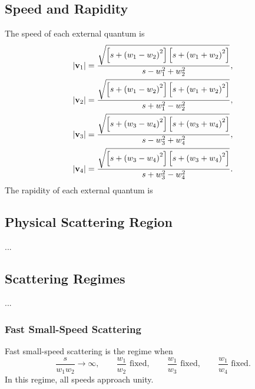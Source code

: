 \subsection{Speed and Rapidity}
The speed of each external quantum is
\begin{align}
	\left\lvert \mathbf{v}_{1} \right\rvert &= \frac{\sqrt{\left[ s + \left( w_{1} - w_{2} \right)^{2} \right] \left[ s + \left( w_{1} + w_{2} \right)^{2} \right]}}{s - w_{1}^{2} + w_{2}^{2}}, \\
	\left\lvert \mathbf{v}_{2} \right\rvert &= \frac{\sqrt{\left[ s + \left( w_{1} - w_{2} \right)^{2} \right] \left[ s + \left( w_{1} + w_{2} \right)^{2} \right]}}{s + w_{1}^{2} - w_{2}^{2}}, \\
	\left\lvert \mathbf{v}_{3} \right\rvert &= \frac{\sqrt{\left[ s + \left( w_{3} - w_{4} \right)^{2} \right] \left[ s + \left( w_{3} + w_{4} \right)^{2} \right]}}{s - w_{3}^{2} + w_{4}^{2}}, \\
	\left\lvert \mathbf{v}_{4} \right\rvert &= \frac{\sqrt{\left[ s + \left( w_{3} - w_{4} \right)^{2} \right] \left[ s + \left( w_{3} + w_{4} \right)^{2} \right]}}{s + w_{3}^{2} - w_{4}^{2}}.
\end{align}
The rapidity of each external quantum is
\subsection{Physical Scattering Region}
...
\subsection{Scattering Regimes}
...
\subsubsection{Fast Small-Speed Scattering}
Fast small-speed scattering is the regime when
\begin{equation}
	\frac{s}{w_{1} w_{2}} \rightarrow \infty, \qquad \frac{w_{1}}{w_{2}} \text{ fixed}, \qquad \frac{w_{1}}{w_{3}} \text{ fixed}, \qquad \frac{w_{1}}{w_{4}} \text{ fixed}.
\end{equation}
In this regime, all speeds approach unity.
